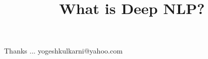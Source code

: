 \documentclass[xcolor=dvipsnames,compress,t,pdf,9pt]{beamer}
\title[\insertframenumber /\inserttotalframenumber]{What is Deep NLP?}
\begin{document}
	\begin{frame}
	\titlepage
	\end{frame}

	
	
	\begin{frame}[c]{}
	Thanks ...
	\vspace{5mm}
	yogeshkulkarni@yahoo.com
	\end{frame}
\end{document}
